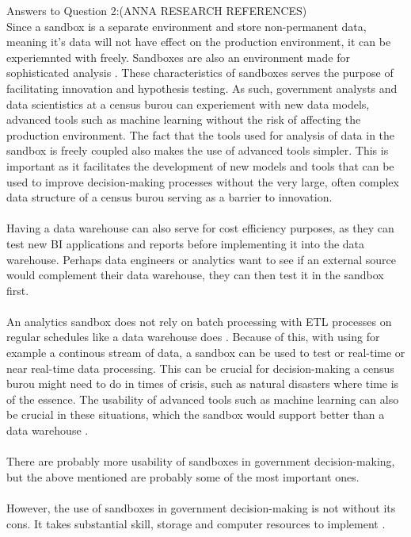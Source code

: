 \newpage Answers to Question 2:(ANNA RESEARCH REFERENCES)
\\Since a sandbox is a separate environment and store non-permanent data\cite{l2video}, meaning it's data will not have effect on 
the production environment, it can be experiemnted with freely. Sandboxes are also an environment made for sophisticated analysis \cite{l2video}.
These characteristics of sandboxes serves the purpose of facilitating innovation and hypothesis testing.
As such, government analysts and data scientistics at a census burou can experiement with new data models, advanced tools such as machine learning
without the risk of affecting the production environment. The fact that the tools used for analysis of data in the sandbox is freely coupled \cite{l2video} also makes the use of advanced tools simpler.
This is important as it facilitates the development of new models and tools that can be used to improve decision-making processes
without the very large, often complex data structure of a census burou serving as a barrier to innovation.
\\\\
Having a data warehouse can also serve for cost efficiency purposes, as they can test new BI applications and reports before implementing it into the data warehouse.
Perhaps data engineers or analytics want to see if an external source would complement their data warehouse, they can then test it in the sandbox first.
\\\\ 
An analytics sandbox does not rely on batch processing with ETL processes on regular schedules like a data warehouse does \cite{l2video}.
Because of this, with using for example a continous stream of data, 
a sandbox can be used to test or real-time or near real-time data processing.
This can be crucial for decision-making a census burou might need to do in times of crisis, 
such as natural disasters where time is of the essence. 
The usability of advanced tools such as machine learning can also be crucial in these situations, 
which the sandbox would support better than a data warehouse \cite{l2video}.
\\\\
There are probably more usability of sandboxes in government decision-making,
but the above mentioned are probably some of the most important ones.
\\\\
However, the use of sandboxes in government decision-making is not without its cons. It takes substantial skill, storage and computer resources to implement \cite{l2video}.
